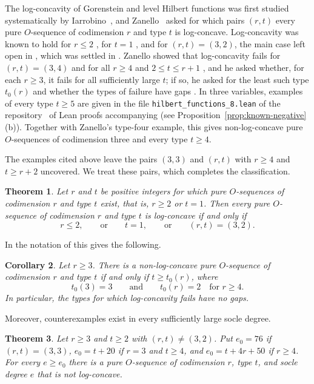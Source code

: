 \documentclass{amsart}
\newtheorem{theorem}{Theorem}[section]
\newtheorem{corollary}[theorem]{Corollary}
\theoremstyle{definition}
\theoremstyle{remark}
\begin{document}
The log-concavity of Gorenstein and level Hilbert functions was first studied systematically by Iarrobino~\cite{Ia}, and Zanello~\cite{Za} asked for which pairs $(r,t)$ every pure $O$-sequence of codimension $r$ and type $t$ is log-concave. Log-concavity was known to hold for $r\le 2$ \cite[Proposition~4.3(i)]{Ia}, for $t=1$ \cite[Proposition~7]{Za}, and for $(r,t)=(3,2)$, the main case left open in \cite{Za}, which was settled in \cite[Appendix~B.4]{TKS}. Zanello showed that log-concavity fails for $(r,t)=(3,4)$ and for all $r\ge 4$ and $2\le t\le r+1$ \cite[Theorem~8]{Za}, and he asked whether, for each $r\ge 3$, it fails for all sufficiently large $t$; if so, he asked for the least such type $t_0(r)$ and whether the types of failure have gaps \cite[Question~9]{Za}. In three variables, examples of every type $t\ge 5$ are given in the file \texttt{hilbert\_functions\_8.lean} of the repository~\cite{AP} of Lean proofs accompanying \cite{TKS} (see Proposition~\ref{prop:known-negative}(b)). Together with Zanello's type-four example, this gives non-log-concave pure $O$-sequences of codimension three and every type $t\ge 4$.

The examples cited above leave the pairs $(3,3)$ and $(r,t)$ with $r\ge 4$ and $t\ge r+2$ uncovered. We treat these pairs, which completes the classification.

\begin{theorem}\label{thm:main}
Let $r$ and $t$ be positive integers for which pure $O$-sequences of codimension $r$ and type $t$ exist, that is, $r\ge 2$ or $t=1$. Then every pure $O$-sequence of codimension $r$ and type $t$ is log-concave if and only if
\[
r\le 2,\qquad\text{or}\qquad t=1,\qquad\text{or}\qquad (r,t)=(3,2).
\]
\end{theorem}

In the notation of \cite[Question~9]{Za} this gives the following.

\begin{corollary}\label{cor:threshold}
Let $r\ge 3$. There is a non-log-concave pure $O$-sequence of codimension $r$ and type $t$ if and only if $t\ge t_0(r)$, where
\[
t_0(3)=3\qquad\text{and}\qquad t_0(r)=2\quad\text{for } r\ge 4.
\]
In particular, the types for which log-concavity fails have no gaps.
\end{corollary}

Moreover, counterexamples exist in every sufficiently large socle degree.

\begin{theorem}\label{thm:degrees}
Let $r\ge 3$ and $t\ge 2$ with $(r,t)\ne (3,2)$. Put $e_0=76$ if $(r,t)=(3,3)$, $e_0=t+20$ if $r=3$ and $t\ge 4$, and $e_0=t+4r+50$ if $r\ge 4$. For every $e\ge e_0$ there is a pure $O$-sequence of codimension $r$, type $t$, and socle degree $e$ that is not log-concave.
\end{theorem}
\end{document}
